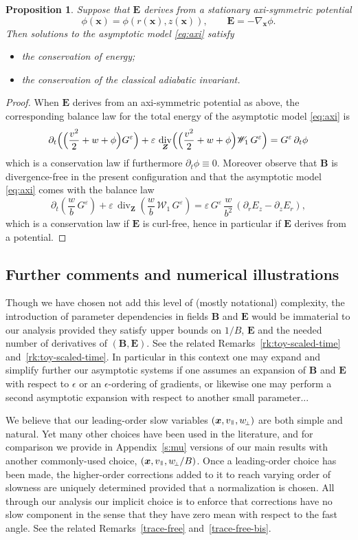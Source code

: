 \documentclass[10pt]{amsart}
\let\mathcal\mathscr
\newcommand{\sperp}{{\scriptscriptstyle\perp}}
\let\eps\varepsilon
\let\d\partial
\DeclareMathOperator{\Div}{div}
\theoremstyle{plain}
\newtheorem{proposition}[theorem]{Proposition}
\theoremstyle{definition}
\newcommand{\bpr}{\begin{proposition}}
\newcommand{\epr}{\end{proposition}}
\newcommand\bB{{\boldsymbol B}}
\newcommand\bE{{\boldsymbol E}}
\newcommand\bfx{{\boldsymbol x}}
\newcommand\bfZ{{\boldsymbol Z}}
\newcommand\cW{{\mathcal W}}
\newcommand\vpar{v_\mypar}
\newcommand\eperp{w_{\!\sperp}}
\let\e w
\newcommand\Er{E_r}
\newcommand\Ez{E_z}
\newcommand{\mypar}{{\mkern3mu\vphantom{\perp}\vrule depth 0pt\mkern2mu\vrule depth 0pt\mkern3mu}}
\begin{document}
\bpr
\label{prop:cons3}
Suppose that $\bE$ derives from a stationary axi-symmetric potential
\[
\phi(\bfx)=\phi(r(\bfx),z(\bfx)),\qquad
\bE=-\nabla_\bfx\phi.
\]
Then solutions to the asymptotic model \eqref{eq:axi} satisfy
\begin{itemize}
\item the conservation of energy;
\item the conservation of the classical adiabatic invariant.
\end{itemize}
\epr
\begin{proof}
When $\bE$ derives from an axi-symmetric potential as above, the corresponding balance law for the total energy of the asymptotic model \eqref{eq:axi} is
\[
\d_t \Bigl(\Bigl(\frac{v^2}{2}+\e+\phi\Bigr)G^\eps\Bigr)+\eps\,\Div_{\bfZ} \Bigl(\Bigl(\frac{v^2}{2}+\e+\phi\Bigr)\cW_1\,G^\eps\Bigr)
=G^\eps\,\d_t\phi
\]
which is a conservation law if furthermore $\d_t\phi\equiv0$. Moreover observe that $\bB$ is divergence-free in the present configuration and that the asymptotic model \eqref{eq:axi} comes with the balance law
\[
\d_t \left(\frac{\e}{b}\,G^\eps\right)+\eps\,\Div_{\bfZ} \left(\frac{\e}{b}\,\cW_1\,G^\eps\right)
=\eps\,G^\eps\,\frac{\e}{b^2}\,(\d_r\Ez-\d_z\Er),
\]
which is a conservation law if $\bE$ is curl-free, hence in particular if $\bE$ derives from a potential.
\end{proof}

\subsection{Further comments and numerical illustrations}

Though we have chosen not add this level of (mostly notational) complexity, the introduction of parameter dependencies in fields $\bB$ and $\bE$ would be immaterial to our analysis provided they satisfy upper bounds on $1/B$, $\bE$ and the needed number of derivatives of $(\bB,\bE)$. See the related Remarks~\ref{rk:toy-scaled-time} and~\ref{rk:toy-scaled-time}. In particular in this context one may expand and simplify further our asymptotic systems if one assumes an expansion of $\bB$ and $\bE$ with respect to $\epsilon$ or an $\epsilon$-ordering of gradients, or likewise one may perform a second asymptotic expansion with respect to another small parameter...

We believe that our leading-order slow variables $(\bfx,\vpar,\eperp)$ are both simple and natural. Yet many other choices have been used in the literature, and for comparison we provide in Appendix~\ref{s:mu} versions of our main results with another commonly-used choice, $(\bfx,\vpar,\eperp/B)$. Once a leading-order choice has been made, the higher-order corrections added to it to reach varying order of slowness are uniquely determined provided that a normalization is chosen. All through our analysis our implicit choice is to enforce that corrections have no slow component in the sense that they have zero mean with respect to the fast angle. See the related Remarks~\ref{trace-free} and~\ref{trace-free-bis}.
\end{document}
